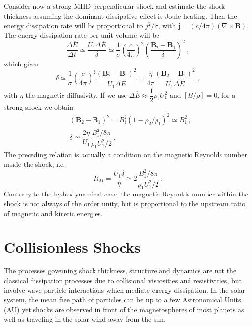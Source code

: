 \documentclass[12pt,a4paper]{article}
\renewcommand{\vec}[1]{\boldsymbol{#1}}
\begin{document}
Consider now a strong MHD perpendicular shock and estimate the shock thickness assuming the dominant dissipative effect is Joule heating. Then the energy dissipation rate will be proportional to $j^2/\sigma$, with $\vec{j} = (c/4\pi)(\nabla \times \vec{B})$. The energy dissipation rate per unit volume will be
\begin{equation*}
\dfrac{\Delta \overline{E}}{\Delta t} \simeq \dfrac{U_1 \Delta \overline{E}}{\delta} \simeq \dfrac{1}{\sigma} \left(\dfrac{c}{4\pi} \right)^2 \left(\dfrac{\vec{B}_2 -\vec{B}_1}{\delta} \right)^2 ~,
\end{equation*}
which gives
\begin{equation*}
\delta \simeq \dfrac{1}{\sigma} \left(\dfrac{c}{4\pi} \right)^2 \dfrac{(\vec{B}_2 -\vec{B}_1)^2}{U_1 \Delta \overline{E}}  = \dfrac{\eta}{4\pi} \dfrac{(\vec{B}_2 -\vec{B}_1)^2}{U_1 \Delta \overline{E}} ~,
\end{equation*}
with $\eta$ the magnetic diffusivity. If we use $\Delta \overline{E} \approx \dfrac{1}{2} \rho_1 U_1^2$ and $[B/\rho] = 0$, for a strong shock we obtain
\begin{align*}
& (\vec{B}_2 -\vec{B}_1)^2 = B_1^2 (1-\rho_2/\rho_1)^2 \simeq B_1^2 ~, \\
& \delta \simeq \dfrac{2\eta}{U_1} \dfrac{B_1^2/8\pi}{\rho_1 U_1^2/2} ~.
\end{align*}
The preceding relation is actually a condition on the magnetic Reynolds number inside the shock, i.e.
\begin{equation*}
R_M = \dfrac{U_1 \delta }{\eta}  \simeq  2\dfrac{B_1^2/8\pi}{\rho_1 U_1^2/2}  ~.
\end{equation*}
Contrary to the hydrodynamical case, the magnetic Reynolds number within the shock is not always of the order unity, but is proportional to the upstream ratio of magnetic and kinetic energies.








\section{Collisionless Shocks}
\cite{2015bps..book.....C} The processes governing shock thickness, structure and dynamics are not the classical dissipation processes due to collisional viscosities and resistivities, but involve wave-particle interactions which mediate energy dissipation. In the solar system, the mean free path of particles can be up to a few Astronomical Units (AU) yet shocks are observed in front of the magnetospheres of most planets as well as traveling in the solar wind away from the sun.
\end{document}
